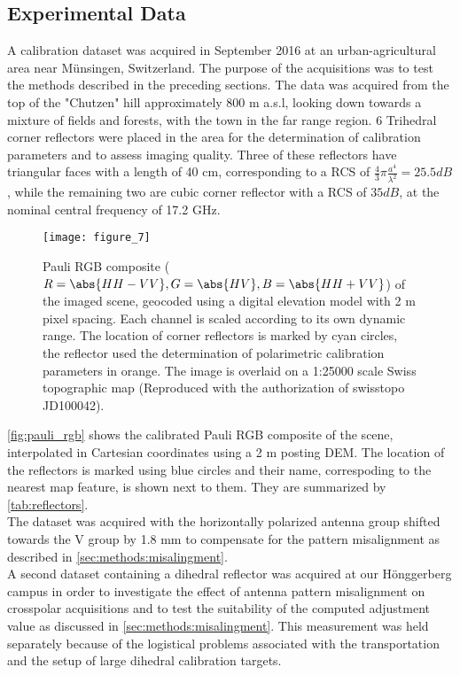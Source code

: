 \subsection{Experimental Data}\label{sec:methods:data}
A calibration dataset was acquired in September 2016 at an urban-agricultural area near M\"{u}nsingen, Switzerland. The purpose of the acquisitions was to test the methods described in the preceding sections. The data was acquired from the top of the "Chutzen" hill approximately 800 m a.s.l, looking down towards a mixture of fields and forests, with the town in the far range region. 6 Trihedral corner reflectors were placed in the area for the determination of calibration parameters and to assess imaging quality. Three of these reflectors have triangular faces with a length of 40 cm, corresponding to a RCS of $\frac{4}{3}\pi \frac{a^4}{\lambda^2}=25.5 dB$, while the remaining two are cubic corner reflector with a RCS of $35 dB$, at the nominal central frequency of 17.2 GHz.
	\begin{figure}
		\centering
		\texttt{[image: figure\_7]}
		\caption{Pauli RGB composite ($R=\abs{HH-VV},G=\abs{HV},B=\abs{HH+VV}$) of the imaged scene, geocoded using a digital elevation model with 2 m pixel spacing. Each channel is scaled according to its own dynamic range. The location of corner reflectors is marked by cyan circles, the reflector used the determination of polarimetric calibration parameters in orange. The image is overlaid on a 1:25000 scale Swiss topographic map (Reproduced with the authorization of swisstopo  JD100042).}
		\label{fig:pauli_rgb}
	\end{figure}
\autoref{fig:pauli_rgb} shows the calibrated Pauli RGB composite of the scene, interpolated in Cartesian coordinates using a 2 m posting DEM.  The location of the reflectors  is marked using blue circles and their name, correspoding to the nearest map feature, is shown next to them. They are summarized by \autoref{tab:reflectors}.\\
The dataset was acquired with the horizontally polarized antenna group shifted towards the V group by 1.8 mm to compensate for the pattern misalignment as described in \autoref{sec:methods:misalingment}.\\
A second dataset containing a dihedral reflector was acquired at our H\"{o}nggerberg campus in order to investigate the effect of antenna pattern misalignment on crosspolar acquisitions and to test the suitability of the computed adjustment value as discussed in \autoref{sec:methods:misalingment}. This measurement was held separately because of the logistical problems associated with the transportation and the setup of large dihedral calibration targets.

